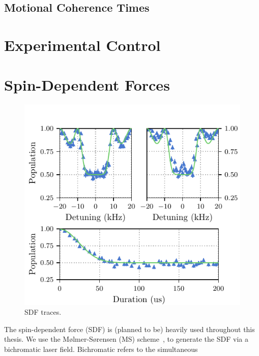 \documentclass[12pt]{report}
\begin{document}
\subsection{Motional Coherence Times}

\section{Experimental Control}
\label{sec:Experimental Control}

\section{Spin-Dependent Forces}
\label{sec:Spin-Dependent Forces}
    \begin{figure}
        \begin{center}
        \noindent\includegraphics[width=\linewidth]{
            figures/pdf_figure/sdf.pdf
            }
        \end{center}
        \caption{
            SDF traces.
            }
        \label{fig:SDF}
    \end{figure}
    The spin-dependent force (SDF) is (planned to be) heavily used throughout
    this thesis. We use the Mølmer-Sørensen (MS) scheme~\cite{}, to generate the
    SDF via a bichromatic laser field. Bichromatic refers to the simultaneous
\end{document}
